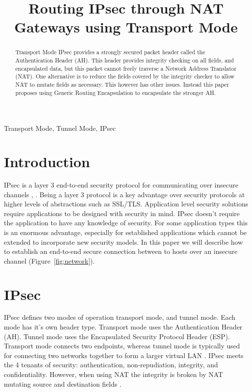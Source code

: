 \documentclass[conference,12pt]{IEEEtran}
\begin{document}
%
\title{Routing IPsec through NAT Gateways using Transport Mode}

\author{
}
\maketitle


\begin{abstract}
Transport Mode IPsec provides a strongly secured packet header called the
Authentication Header (AH). This header provides integrity checking on all fields,
and encapsulated data, but this packet cannot freely traverse a Network Address
Translator (NAT).  One alternative is to reduce the fields covered by the
integrity checker to allow NAT to mutate fields as necessary. This however has
other issues. Instead this paper proposes using Generic Routing Encapsulation to
encapsulate the stronger AH. 
\end{abstract}

\begin{IEEEkeywords}
    Transport Mode, Tunnel Mode, IPsec
\end{IEEEkeywords}

\section{Introduction}
IPsec is a layer 3 end-to-end security protocol for communicating over insecure
channels \autocite{rfc4301}, \autocite{_osi_2014}.  Being a layer 3 protocol
is a key advantage over security protocols at higher levels of abstractions
such as SSL/TLS. Application level security solutions require applications to be
designed with security in mind. IPsec doesn't require the application
to have any knowledge of security. For some application types this is an
enormous advantage, especially for established applications which cannot be
extended to incorporate new security models. In this paper we will describe 
how to establish an end-to-end secure connection between to hosts over an
insecure channel (Figure~\ref{fig:network}).

\section{IPsec}
IPsec defines two modes of operation transport mode, and tunnel mode. Each mode
has it's own header type. Transport mode uses the Authentication Header (AH). 
Tunnel mode uses the Encapsulated Security Protocol Header (ESP). Transport mode
connects two endpoints, whereas tunnel mode is typically
used for connecting two networks together to form a larger virtual LAN
\autocite{cisco_ipsec}. IPsec meets the 4 tenants of security:
authentication, non-repudiation, integrity, and confidentiality. However,
 when using NAT the integrity is broken by NAT mutating source and destination
 fields \autocite{rfc3022}.
\end{document}
